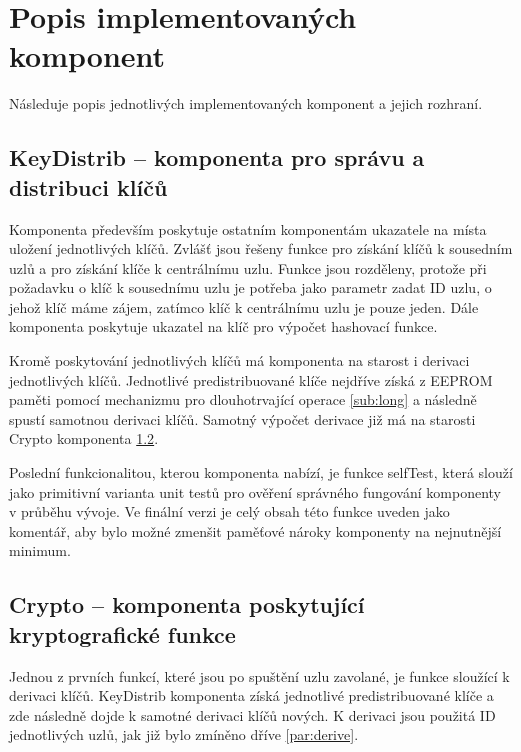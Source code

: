 \documentclass[11pt,final,twoside]{fithesis2}
\begin{document}
\section{Popis implementovaných komponent}
Následuje popis jednotlivých implementovaných komponent a jejich rozhraní. 
\subsection{KeyDistrib -- komponenta pro správu a distribuci klíčů}

Komponenta především poskytuje ostatním komponentám ukazatele na místa uložení jednotlivých klíčů. Zvlášť jsou řešeny funkce pro získání klíčů k sousedním uzlů a pro získání klíče k centrálnímu uzlu. 
Funkce jsou rozděleny, protože při požadavku o klíč k sousednímu uzlu je potřeba jako parametr zadat ID uzlu, o jehož klíč máme zájem, zatímco klíč k centrálnímu uzlu je pouze jeden. Dále komponenta 
poskytuje ukazatel na klíč pro výpočet hashovací funkce.

Kromě poskytování jednotlivých klíčů má komponenta na starost i derivaci jednotlivých klíčů. Jednotlivé predistribuované klíče nejdříve získá z EEPROM paměti pomocí mechanizmu pro dlouhotrvající operace 
\ref{sub:long} a následně spustí samotnou derivaci klíčů. Samotný výpočet derivace již má na starosti Crypto komponenta \ref{sub:crypto}. 

Poslední funkcionalitou, kterou komponenta nabízí, je funkce selfTest, která slouží jako primitivní varianta unit testů pro ověření správného fungování komponenty v průběhu vývoje. Ve finální verzi je
celý obsah této funkce uveden jako komentář, aby bylo možné zmenšit paměťové nároky komponenty na nejnutnější minimum. 

\subsection{Crypto -- komponenta poskytující kryptografické funkce} \label{sub:crypto}

Jednou z prvních funkcí, které jsou po spuštění uzlu zavolané, je funkce sloužící k derivaci klíčů. KeyDistrib komponenta získá jednotlivé predistribuované klíče a zde následně dojde 
k samotné derivaci klíčů nových. K derivaci jsou použitá ID jednotlivých uzlů, jak již bylo zmíněno dříve \ref{par:derive}.
\end{document}
